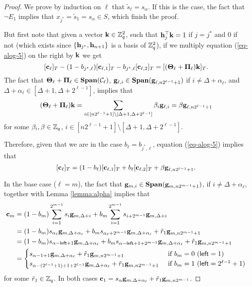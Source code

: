 \begin{proof}
We prove by induction on \(\ell\) that \(\tilde{s}_\ell=s_{\alpha}\). If this is the case, the fact that \(\neg E_1\) implies that \(x_{j^*}=\tilde{s}_1=s_{\alpha}\in S\), which finish the proof.

But first note that given a vector \(\mathbf{k}\in\mathbb{Z}_q^2\), such that \(\mathbf{h}_j^\top\mathbf{k}=1\) if \(j=j^*\) and \(0\) if not (which exists since \(\{\mathbf{h}_{j^*},\mathbf{h}_{n+1}\}\) is a basis of \(\mathbb{Z}_q^2\)), if we multiply equation (\ref{eq-alog-5}) on the right by $\mathbf{k}$ we get
$$
[\mathbf{c}_\ell]_T-(1-b_{j^*,\ell})[\mathbf{c}_{\ell,1}]_T-b_{j^*,\ell}[\mathbf{c}_{\ell,2}]_T=[(\mathbf{{\Theta}}_\ell+\mathbf{{\Pi}}_\ell)\mathbf{k}]_T.
$$
The fact that \(\mathbf{{\Theta}}_\ell+\mathbf{{\Pi}}_\ell\in\mathbf{Span}(\mathcal{C}_\ell)\), \(\mathbf{g}_{\ell,i}\in\mathbf{Span}(\mathbf{g}_{\ell,n2^{\ell-1}+1})\) if \(i\neq \Delta+\alpha_\ell\), and $\Delta+\alpha_\ell\in[\Delta+1,\Delta+2^{\ell-1}]$, implies that
$$(\mathbf{{\Theta}}_\ell+\mathbf{{\Pi}}_\ell)\mathbf{k} = \sum_{i\in[n2^{\ell-1}+1]\setminus[\Delta+1,\Delta+2^{\ell-1}]}\beta_i\mathbf{g}_{\ell,i}=\beta\mathbf{g}_{\ell,n2^{\ell-1}+1}$$
for some $\beta_i,{\beta}\in\mathbb{Z}_q$, $i\in[n2^{\ell-1}+1]\setminus[\Delta+1,\Delta+2^{\ell-1}]$.

Therefore, given that we are in the case $b_\ell=b_{j^*,\ell}$, equation (\ref{eq-alog-5}) implies that
$$
[\mathbf{c}_\ell]_T=(1-b_{\ell})[\mathbf{c}_{\ell,1}]_T+b_{\ell}[\mathbf{c}_{\ell,2}]_T+\beta\mathbf{g}_{\ell,n2^{\ell-1}+1}.
$$

In the base case ($\ell=m$), the fact that \(\mathbf{g}_{m,i}\in\mathbf{Span}(\mathbf{g}_{m,n2^{m-1}+1})\), if \(i\neq \Delta+\alpha_\ell\), together with Lemma \ref{lemma:alpha} implies that 
\begin{align*}
\mathbf{c}_m &= (1-b_m)\sum_{i=1}^{2^{m-1}}s_i \mathbf{g}_{m,\Delta+i}+b_m\sum_{i=1}^{2^{m-1}}s_{i+2^{m-1}}\mathbf{g}_{m,\Delta+i}\\
&= (1-b_m)s_{\alpha_\ell}\mathbf{g}_{m,\Delta+\alpha_\ell} +b_ms_{\alpha_\ell+2^{m-1}}\mathbf{g}_{m,\Delta+\alpha_\ell}+\tilde{r}_1\mathbf{g}_{m,n2^{m-1}+1}\\
&= (1-b_m)s_{\alpha-{\mathsf{left}}+1}\mathbf{g}_{m,\Delta+\alpha_\ell} +b_ms_{\alpha-{\mathsf{left}}+1+2^{m-1}}\mathbf{g}_{m,\Delta+\alpha_\ell}+\tilde{r}_1\mathbf{g}_{m,n2^{m-1}+1}\\
&=\begin{cases}
    s_{\alpha-1+1}\mathbf{g}_{m,\Delta+\alpha_\ell}+\tilde{r}_1\mathbf{g}_{m,n2^{m-1}+1} & \text{ if } b_m=0 \ ({\mathsf{left}}=1) \\
    s_{\alpha-(2^{\ell-1}+1)+1+2^{\ell-1}}\mathbf{g}_{m,\Delta+\alpha_\ell}+\tilde{r}_1\mathbf{g}_{m,n2^{m-1}+1} & \text{ if } b_m=1 \ ({\mathsf{left}}=2^{\ell-1}+1) 
\end{cases}
\end{align*}
for some \(\tilde{r}_1\in\mathbb{Z}_q\). In both cases $\mathbf{c}_1=s_\alpha\mathbf{g}_{m,\Delta+\alpha_\ell}+\tilde{r}_1\mathbf{g}_{m,n2^{m-1}}$.


\end{proof}
